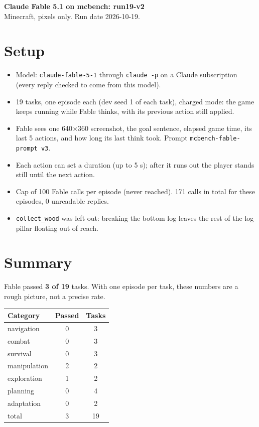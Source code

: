 \documentclass[10pt]{article}
\begin{document}
{\Large\bfseries Claude Fable 5.1 on mcbench: run19-v2}\\[2pt]
Minecraft, pixels only. Run date 2026-10-19.

\section*{Setup}
\begin{itemize}\itemsep0pt
\item Model: \texttt{claude-fable-5-1} through \texttt{claude -p} on a Claude subscription (every reply checked to come from this model).
\item 19 tasks, one episode each (dev seed 1 of each task), charged mode: the game keeps running while Fable thinks, with its previous action still applied.
\item Fable sees one 640$\times$360 screenshot, the goal sentence, elapsed game time, its last 5 actions, and how long its last think took. Prompt \texttt{mcbench-fable-prompt v3}.
\item Each action can set a duration (up to 5 s); after it runs out the player stands still until the next action.
\item Cap of 100 Fable calls per episode (never reached). 171 calls in total for these episodes, 0 unreadable replies.
\item \texttt{collect\_wood} was left out: breaking the bottom log leaves the rest of the log pillar floating out of reach.
\end{itemize}

\section*{Summary}
Fable passed \textbf{3 of 19} tasks. With one episode per task, these numbers are a rough picture, not a precise rate.

\begin{table}[H]\centering
\begin{tabular}{lcc}\toprule
Category & Passed & Tasks \\\midrule
navigation & 0 & 3 \\
combat & 0 & 3 \\
survival & 0 & 3 \\
manipulation & 2 & 2 \\
exploration & 1 & 2 \\
planning & 0 & 4 \\
adaptation & 0 & 2 \\
\midrule
total & 3 & 19 \\\bottomrule
\end{tabular}\end{table}
\end{document}

